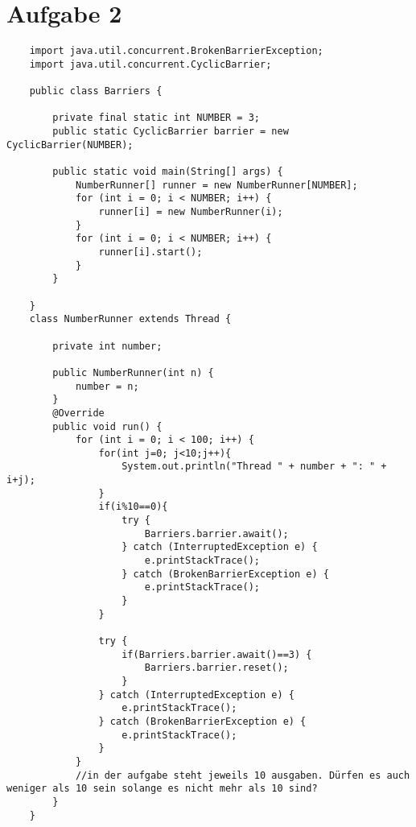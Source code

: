 \documentclass[12pt,a4paper,oneside,ngerman]{article}
\begin{document}
\section*{Aufgabe 2}
\begin{lstlisting}
	import java.util.concurrent.BrokenBarrierException;
	import java.util.concurrent.CyclicBarrier;
	
	public class Barriers {
	
		private final static int NUMBER = 3;
		public static CyclicBarrier barrier = new CyclicBarrier(NUMBER);
	
		public static void main(String[] args) {
			NumberRunner[] runner = new NumberRunner[NUMBER];
			for (int i = 0; i < NUMBER; i++) {
				runner[i] = new NumberRunner(i);
			}
			for (int i = 0; i < NUMBER; i++) {
				runner[i].start();
			}
		}
	
	}
	class NumberRunner extends Thread {
	
		private int number;
	
		public NumberRunner(int n) {
			number = n;
		}
		@Override
		public void run() {
			for (int i = 0; i < 100; i++) {
				for(int j=0; j<10;j++){
					System.out.println("Thread " + number + ": " + i+j);
				}
				if(i%10==0){
					try {
						Barriers.barrier.await();
					} catch (InterruptedException e) {
						e.printStackTrace();
					} catch (BrokenBarrierException e) {
						e.printStackTrace();
					}
				}
	
				try {
					if(Barriers.barrier.await()==3) {
						Barriers.barrier.reset();
					}
				} catch (InterruptedException e) {
					e.printStackTrace();
				} catch (BrokenBarrierException e) {
					e.printStackTrace();
				}
			}
			//in der aufgabe steht jeweils 10 ausgaben. Dürfen es auch weniger als 10 sein solange es nicht mehr als 10 sind?
		}
	}		
\end{lstlisting}
\end{document}

